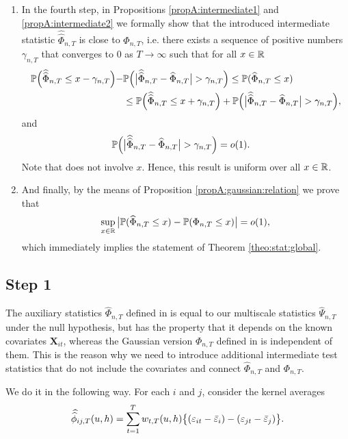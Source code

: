 \documentclass[a4paper,12pt]{article}
\makeatletter
\renewcommand{\eqref}[1]{\tagform@{\ref{#1}}}
\newcommand{\doublehat}[1]{\skew{5.5}\widehat{\widehat{#1}}}
\newcommand{\doublehattwo}[1]{\widehat{\widehat{#1}}}
\makeatother
\begin{document}
\begin{enumerate}
\item In the fourth step, in Propositions \ref{propA:intermediate1} and \ref{propA:intermediate2} we formally show that the introduced intermediate statistic $\doublehattwo{\Phi}_{n, T}$ is close to $\widehat{\Phi}_{n, T}$, i.e. there exists a sequence of positive numbers $\gamma_{n, T}$ that converges to $0$ as $T \to \infty$ such that for all $x\in \mathbb{R}$ 
\begin{align*}
\pr\Big(\doublehattwo{\Phi}_{n,T} \le x - \gamma_{n, T}\Big) - &\pr \Big(\big|\doublehattwo{\Phi}_{n,T} - \widehat{\Phi}_{n,T}\big| > \gamma_{n, T} \Big)\le \pr(\widehat{\Phi}_{n, T} \le x) \\
&\le\pr\Big(\doublehattwo{\Phi}_{n,T} \le x + \gamma_{n, T}\Big) + \pr \Big(\big|\doublehattwo{\Phi}_{n,T} - \widehat{\Phi}_{n,T}\big| > \gamma_{n, T} \Big),
\end{align*}
and
\begin{align}\label{eqA:intermediate1}
\pr \Big(\big|\doublehattwo{\Phi}_{n,T} &- \widehat{\Phi}_{n,T}\big| > \gamma_{n, T} \Big) = o(1).
\end{align}
Note that \eqref{eqA:intermediate1} does not involve $x$. Hence, this result is uniform over all $x \in \mathbb{R}$. 

\item And finally, by the means of Proposition \ref{propA:gaussian:relation} we prove that  
\begin{equation*}
\sup_{x \in \mathbb{R}} \big| \mathbb{P}(\widehat{\Phi}_{n, T} \le x) - \mathbb{P}(\Phi_{n,T} \le x) \big| = o(1),
\end{equation*}
which immediately implies the statement of Theorem \ref{theo:stat:global}.
\end{enumerate}

\subsection*{Step 1}

The auxiliary statistics $\widehat{\Phi}_{n,T}$ defined in \eqref{eq:Phi_hat} is equal to our multiscale statistics $\widehat{\Psi}_{n,T}$ under the null hypothesis, but has the property that it depends on the known covariates $\mathbf{X}_{it}$, whereas the Gaussian version $\Phi_{n,T}$ defined in \eqref{eq:Phi} is independent of them. This is the reason why we need to introduce additional intermediate test statistics that do not include the covariates and connect $\widehat{\Phi}_{n,T}$ and $\Phi_{n,T}$. 

We do it in the following way. For each $i$ and $j$, consider the kernel averages
\[\doublehat{\phi}_{ij,T}(u,h) = \sum_{t=1}^T w_{t,T}(u,h) \big\{ (\varepsilon_{it} - \bar{\varepsilon}_i) - (\varepsilon_{jt} - \bar{\varepsilon}_j)  \big\}. \]
\end{document}
